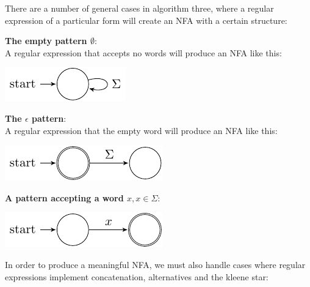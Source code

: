 
There are a number of general cases in algorithm three, where a regular
expression of a particular form will create an NFA with a certain structure:

\begin{description}
  \item {\bf The empty pattern $\emptyset$}:\\
    A regular expression that accepts no words will produce an NFA like
    this:
    \begin{center}
      \includegraphics{automata/12.pdf}
    \end{center}
  \item {\bf The $\epsilon$ pattern}:\\
    A regular expression that the empty word will produce an NFA like this:
    \begin{center}
      \includegraphics{automata/13.pdf}
    \end{center}
  \item {\bf A pattern accepting a word $x, x \in \Sigma$}:\\
    \begin{center}
      \includegraphics{automata/14.pdf}
    \end{center}
\end{description}

In order to produce a meaningful NFA, we must also handle cases where regular
expressions implement concatenation, alternatives and the kleene star:

